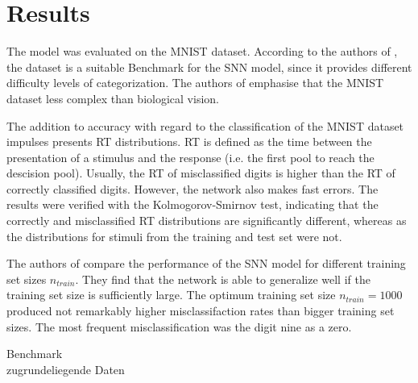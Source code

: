 \section{Results}
\label{sec:result}
The model was evaluated on the MNIST dataset.
According to the authors of \cite{STDP_like}, the dataset is a suitable Benchmark for the \ac{SNN} model, 
since it provides different difficulty levels of categorization.
The authors of \cite{STDP_like} emphasise that the MNIST dataset less complex than biological vision.

The addition to accuracy with regard to the classification of the MNIST dataset impulses \cite{STDP_like} presents \ac{RT} distributions.
\ac{RT} is defined as the time between the presentation of a stimulus and the response (i.e. the first pool to reach the descision pool).
Usually, the \ac{RT} of misclassified digits is higher than the \ac{RT} of correctly classified digits.
However, the network also makes fast errors.
The results were verified with the Kolmogorov-Smirnov test, 
indicating that the correctly and misclassified \ac{RT} distributions are significantly different, 
whereas as the distributions for stimuli from the training and test set were not.

The authors of \cite{STDP_like} compare the performance of the \ac{SNN} model for different training set sizes $n_{train}$.
They find that the network is able to generalize well if the training set size is sufficiently large.
The optimum training set size $n_{train} = 1000$ produced not remarkably higher misclassifaction rates than bigger training set sizes.
The most frequent misclassification was the digit nine as a zero.



Benchmark\\
zugrundeliegende Daten